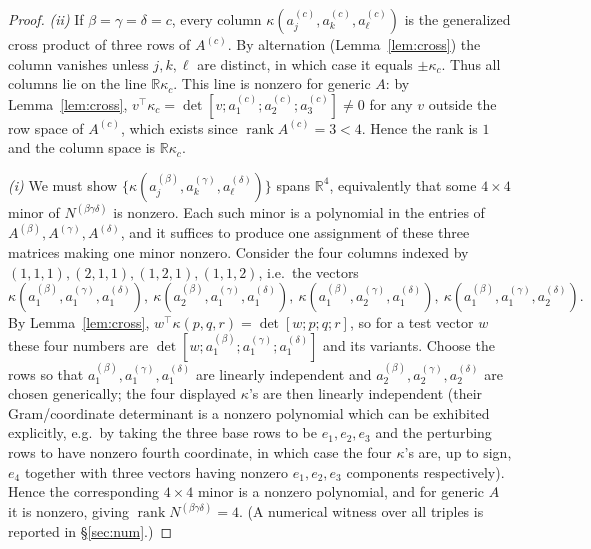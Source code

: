 \documentclass[12pt]{article}
\DeclareMathOperator{\rank}{rank}
\newcommand{\bR}{\mathbb{R}}
\theoremstyle{definition}
\begin{document}
\begin{proof}
\emph{(ii)} If $\beta=\gamma=\delta=c$, every column
$\kappa(a^{(c)}_j,a^{(c)}_k,a^{(c)}_\ell)$ is the generalized cross product of three
rows of $A^{(c)}$.  By alternation (Lemma~\ref{lem:cross}) the column vanishes unless
$j,k,\ell$ are distinct, in which case it equals $\pm\kappa_c$.  Thus all columns lie
on the line $\bR\kappa_c$.  This line is nonzero for generic $A$: by
Lemma~\ref{lem:cross}, $v^\top\kappa_c=\det[v;a^{(c)}_1;a^{(c)}_2;a^{(c)}_3]\ne0$ for
any $v$ outside the row space of $A^{(c)}$, which exists since $\rank A^{(c)}=3<4$.
Hence the rank is $1$ and the column space is $\bR\kappa_c$.

\emph{(i)} We must show $\{\kappa(a^{(\beta)}_j,a^{(\gamma)}_k,a^{(\delta)}_\ell)\}$
spans $\bR^4$, equivalently that some $4\times4$ minor of $N^{(\beta\gamma\delta)}$ is
nonzero.  Each such minor is a polynomial in the entries of
$A^{(\beta)},A^{(\gamma)},A^{(\delta)}$, and it suffices to produce one assignment of
these three matrices making one minor nonzero.  Consider the four columns indexed by
$(1,1,1),(2,1,1),(1,2,1),(1,1,2)$, i.e.\ the vectors
\[
\kappa(a^{(\beta)}_1,a^{(\gamma)}_1,a^{(\delta)}_1),\
\kappa(a^{(\beta)}_2,a^{(\gamma)}_1,a^{(\delta)}_1),\
\kappa(a^{(\beta)}_1,a^{(\gamma)}_2,a^{(\delta)}_1),\
\kappa(a^{(\beta)}_1,a^{(\gamma)}_1,a^{(\delta)}_2).
\]
By Lemma~\ref{lem:cross}, $w^\top\kappa(p,q,r)=\det[w;p;q;r]$, so for a test vector
$w$ these four numbers are
$\det[w;a^{(\beta)}_1;a^{(\gamma)}_1;a^{(\delta)}_1]$ and its variants.  Choose the
rows so that $a^{(\beta)}_1,a^{(\gamma)}_1,a^{(\delta)}_1$ are linearly independent
and $a^{(\beta)}_2,a^{(\gamma)}_2,a^{(\delta)}_2$ are chosen generically; the four
displayed $\kappa$'s are then linearly independent (their Gram/coordinate determinant
is a nonzero polynomial which can be exhibited explicitly, e.g.\ by taking the three
base rows to be $e_1,e_2,e_3$ and the perturbing rows to have nonzero fourth
coordinate, in which case the four $\kappa$'s are, up to sign, $e_4$ together with
three vectors having nonzero $e_1,e_2,e_3$ components respectively).  Hence the
corresponding $4\times4$ minor is a nonzero polynomial, and for generic $A$ it is
nonzero, giving $\rank N^{(\beta\gamma\delta)}=4$.  (A numerical witness over all
triples is reported in \S\ref{sec:num}.)
\end{proof}
\end{document}
